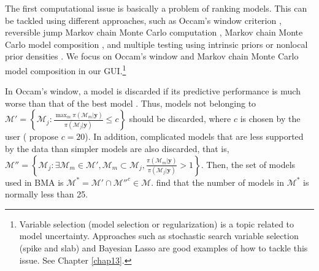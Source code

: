 \begin{table}[!ht]
	\label{tab:chap10}
\end{table}
The first computational issue is basically a problem of ranking models. This can be tackled using different approaches, such as Occam's window criterion \cite{Madigan1994,Raftery1997}, reversible jump Markov chain Monte Carlo computation \cite{Green1995}, Markov chain Monte Carlo model composition \cite{madigan95}, and multiple testing using intrinsic priors \cite{Casella2006} or nonlocal prior densities \cite{Johnson2012}. We focus on Occam's window and Markov chain Monte Carlo model composition in our GUI.\footnote{Variable selection (model selection or regularization) is a topic related to model uncertainty. Approaches such as stochastic search variable selection (spike and slab) \cite{George1993,George1997} and Bayesian Lasso \cite{Park2008} are good examples of how to tackle this issue. See Chapter \ref{chap13}.}

In Occam's window, a model is discarded if its predictive performance is much worse than that of the best model  \cite{Madigan1994,Raftery1997}.
Thus, models not belonging to $\mathcal{M}'=\left\{\mathcal{M}_j:\frac{\max_m {\pi(\mathcal{M}_m|\bm{y})}}{\pi(\mathcal{M}_j|\bm{y})}\leq c\right\}$ should be discarded, where $c$ is chosen by the user (\cite{Madigan1994} propose $c=20$).
In addition, complicated models that are less supported by the data than simpler models are also discarded, that is, $\mathcal{M}''=\left\{\mathcal{M}_j:\exists \mathcal{M}_m\in\mathcal{M}',\mathcal{M}_m\subset \mathcal{M}_j,\frac{\pi(\mathcal{M}_m|\bm{y})}{\pi(\mathcal{M}_j|\bm{y})}>1\right\}$. Then, the set of models used in BMA is $\mathcal{M}^*=\mathcal{M}'\cap \mathcal{M}''^c\in\mathcal{M}$. \cite{Raftery1997} find that the number of models in $\mathcal{M}^*$ is normally less than 25.

